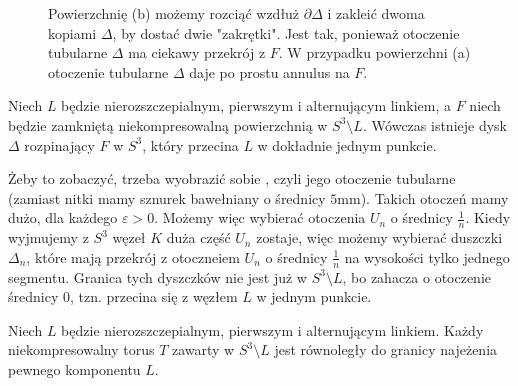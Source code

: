\documentclass{article}
\begin{document}
\begin{figure}
{
}
\caption{\label{pierwszy} Powierzchnię (b) możemy rozciąć wzdłuż $\partial\Delta$ i zakleić dwoma kopiami $\Delta$, by dostać dwie "zakrętki". Jest tak, ponieważ otoczenie tubularne $\Delta$ ma ciekawy przekrój z $F$. W przypadku powierzchni (a) otoczenie tubularne $\Delta$ daje po prostu annulus na $F$. }%
\end{figure}

\begin{fuck}
  Niech $L$ będzie nierozszczepialnym, pierwszym i alternującym linkiem, a $F$ niech będzie zamkniętą niekompresowalną powierzchnią w $S^3\setminus L$. Wówczas istnieje dysk $\Delta$ rozpinający $F$ w $S^3$, który przecina $L$ w dokładnie jednym punkcie.
\end{fuck}

Żeby to zobaczyć, trzeba wyobrazić sobie , czyli jego otoczenie tubularne (zamiast nitki mamy sznurek bawełniany o średnicy $5$mm). Takich otoczeń mamy dużo, dla każdego $\varepsilon>0$. Możemy więc wybierać otoczenia $U_n$ o średnicy $\frac{1}{n}$. Kiedy wyjmujemy z $S^3$ węzeł $K$ duża część $U_n$ zostaje, więc możemy wybierać duszczki $\Delta_n$, które mają przekrój z otoczneiem $U_n$ o średnicy $\frac{1}{n}$ na wysokości tylko jednego segmentu. Granica tych dyszczków nie jest już w $S^3\setminus L$, bo zahacza o otoczenie średnicy $0$, tzn. przecina się z węzłem $L$ w jednym punkcie.

\begin{fuck}
  Niech $L$ będzie nierozszczepialnym, pierwszym i alternującym linkiem. Każdy niekompresowalny torus $T$ zawarty w $S^3\setminus L$ jest równoległy do granicy najeżenia pewnego komponentu $L$.
\end{fuck}
\end{document}
